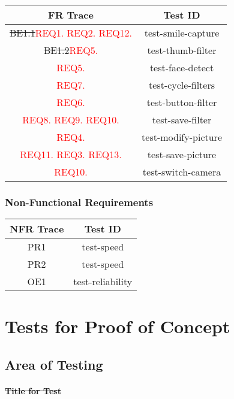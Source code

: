 \documentclass[12pt, titlepage]{article}
\begin{document}
\begin{center}
\begin{tabular}{ |c|c| } 
 \hline
 FR Trace & Test ID \\ 
  \hline
   \hline
\sout{BE1.1}\textcolor{red}{REQ1. REQ2. REQ12.} & test-smile-capture \\ 
  \hline
\sout{BE1.2}\textcolor{red}{REQ5.} & test-thumb-filter \\ 
 \hline
 \textcolor{red}{REQ5.} & test-face-detect \\ 
 \hline
 \textcolor{red}{REQ7.} & test-cycle-filters \\ 
 \hline
 \textcolor{red}{REQ6.} & test-button-filter \\ 
 \hline
 \textcolor{red}{REQ8. REQ9. REQ10.} & test-save-filter \\ 
 \hline
 \textcolor{red}{REQ4.} & test-modify-picture \\ 
 \hline
 \textcolor{red}{REQ11. REQ3. REQ13.} & test-save-picture \\ 
 \hline
 \textcolor{red}{REQ10.} & test-switch-camera \\ 
 \hline
\end{tabular}
\end{center}

\subsubsection{Non-Functional Requirements}
\begin{center}
\begin{tabular}{ |c|c| } 
 \hline
 NFR Trace & Test ID \\ 
  \hline
   \hline
PR1 & test-speed \\ 
  \hline
PR2 & test-speed \\ 
  \hline
OE1 & test-reliability \\ 
 \hline
\end{tabular}
\end{center}
\section{Tests for Proof of Concept}

\subsection{Area of Testing}
		
\paragraph{\sout{Title for Test}}
\end{document}
